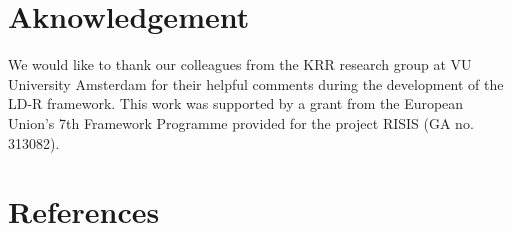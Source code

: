 \documentclass{acm_proc_article-sp}
\begin{document}
\section{Aknowledgement}
We would like to thank our colleagues from the KRR research group at VU University Amsterdam for their helpful comments during the development of the LD-R framework. This work was supported by a grant from the European Union’s 7th Framework Programme provided for the project RISIS (GA no. 313082).

\section{References}
\end{document}
